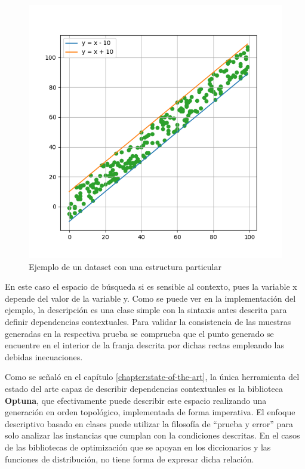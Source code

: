 \begin{figure}[!ht]
      \includegraphics[width=\linewidth]{Graphics/center.png}
      \caption{Ejemplo de un dataset con una estructura particular}
      \label{fig:centers}
\end{figure}

En este caso el espacio de búsqueda si es sensible al contexto, pues la variable x depende del 
valor de la variable y. Como se puede ver en la
implementación del ejemplo, la descripción es una clase simple con la sintaxis antes descrita para definir
dependencias contextuales. Para validar la consistencia de las muestras generadas en la respectiva prueba se
comprueba que el punto generado se encuentre en el interior de la franja descrita por dichas rectas empleando
las debidas inecuaciones.

Como se señaló en el capítulo \ref{chapter:state-of-the-art}, la única herramienta del estado del arte capaz de
describir dependencias contextuales es la biblioteca {\bf Optuna}, que efectivamente puede describir este espacio
realizando una generación en orden topológico, implementada de forma imperativa. El enfoque descriptivo basado en clases
puede utilizar la filosofía de ``prueba y error'' para solo analizar las instancias que cumplan con la condiciones
descritas. En el casos de las bibliotecas de optimización que se apoyan en los diccionarios y las funciones de
distribución, no tiene forma de expresar dicha relación.

